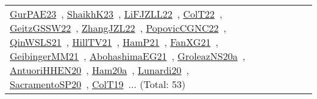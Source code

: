 {\begin{longtable}{lp{3cm}>{\raggedright\arraybackslash}p{6cm}>{\raggedright\arraybackslash}p{6cm}>{\raggedright\arraybackslash}p{8cm}}
\href{../works/GurPAE23.pdf}{GurPAE23}~\cite{GurPAE23}, \href{../works/ShaikhK23.pdf}{ShaikhK23}~\cite{ShaikhK23}, \href{../works/LiFJZLL22.pdf}{LiFJZLL22}~\cite{LiFJZLL22}, \href{../works/ColT22.pdf}{ColT22}~\cite{ColT22}, \href{../works/GeitzGSSW22.pdf}{GeitzGSSW22}~\cite{GeitzGSSW22}, \href{../works/ZhangJZL22.pdf}{ZhangJZL22}~\cite{ZhangJZL22}, \href{../works/PopovicCGNC22.pdf}{PopovicCGNC22}~\cite{PopovicCGNC22}, \href{../works/QinWSLS21.pdf}{QinWSLS21}~\cite{QinWSLS21}, \href{../works/HillTV21.pdf}{HillTV21}~\cite{HillTV21}, \href{../works/HamP21.pdf}{HamP21}~\cite{HamP21}, \href{../works/FanXG21.pdf}{FanXG21}~\cite{FanXG21}, \href{../works/GeibingerMM21.pdf}{GeibingerMM21}~\cite{GeibingerMM21}, \href{../works/AbohashimaEG21.pdf}{AbohashimaEG21}~\cite{AbohashimaEG21}, \href{../works/GroleazNS20a.pdf}{GroleazNS20a}~\cite{GroleazNS20a}, \href{../works/AntuoriHHEN20.pdf}{AntuoriHHEN20}~\cite{AntuoriHHEN20}, \href{../works/Ham20a.pdf}{Ham20a}~\cite{Ham20a}, \href{../works/Lunardi20.pdf}{Lunardi20}~\cite{Lunardi20}, \href{../works/SacramentoSP20.pdf}{SacramentoSP20}~\cite{SacramentoSP20}, \href{../works/ColT19.pdf}{ColT19}~\cite{ColT19}... (Total: 53)\\

\end{longtable}}
